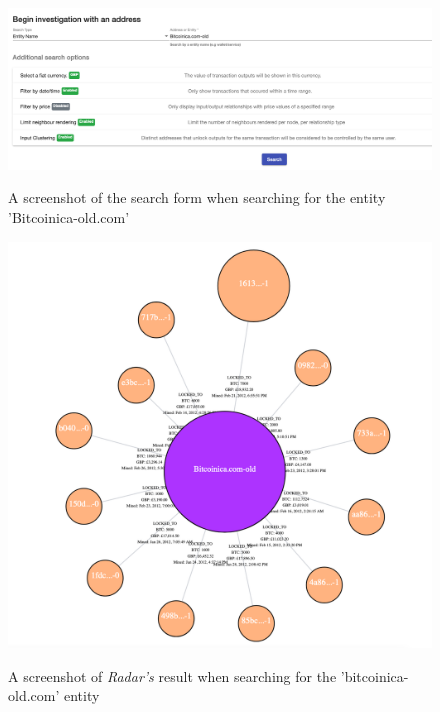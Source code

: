 \begin{figure}[h!]
  \centering
  \includegraphics[width = 15cm]{./figures/ui-screenshots/bitcoinica-search-form}\\[0.5cm]
  \caption{A screenshot of the search form when searching for the entity 'Bitcoinica-old.com'}
  \label{fig:bitcoinica-search-form}
\end{figure}

\begin{figure}[h!]
  \centering
  \includegraphics[width = 15cm]{./figures/bitcoinica-enity-search}\\[0.5cm]
  \caption{A screenshot of \textit{Radar's} result when searching for the 'bitcoinica-old.com' entity}
  \label{fig:bitcoinica-old-result}
\end{figure}

